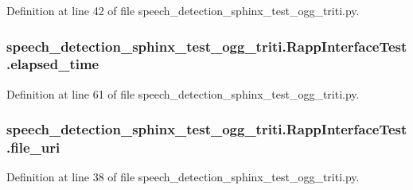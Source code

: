 Definition at line 42 of file speech\-\_\-detection\-\_\-sphinx\-\_\-test\-\_\-ogg\-\_\-triti.\-py.

\hypertarget{classspeech__detection__sphinx__test__ogg__triti_1_1RappInterfaceTest_ac9f45476720710babd099d31b4163fb3}{
\subsubsection[{elapsed\-\_\-time}]{\setlength{\rightskip}{0pt plus 5cm}speech\-\_\-detection\-\_\-sphinx\-\_\-test\-\_\-ogg\-\_\-triti.\-Rapp\-Interface\-Test.\-elapsed\-\_\-time}}\label{classspeech__detection__sphinx__test__ogg__triti_1_1RappInterfaceTest_ac9f45476720710babd099d31b4163fb3}


Definition at line 61 of file speech\-\_\-detection\-\_\-sphinx\-\_\-test\-\_\-ogg\-\_\-triti.\-py.

\hypertarget{classspeech__detection__sphinx__test__ogg__triti_1_1RappInterfaceTest_a8ae9d9b1ad54407d709325d82b7d0bfc}{
\subsubsection[{file\-\_\-uri}]{\setlength{\rightskip}{0pt plus 5cm}speech\-\_\-detection\-\_\-sphinx\-\_\-test\-\_\-ogg\-\_\-triti.\-Rapp\-Interface\-Test.\-file\-\_\-uri}}\label{classspeech__detection__sphinx__test__ogg__triti_1_1RappInterfaceTest_a8ae9d9b1ad54407d709325d82b7d0bfc}


Definition at line 38 of file speech\-\_\-detection\-\_\-sphinx\-\_\-test\-\_\-ogg\-\_\-triti.\-py.

